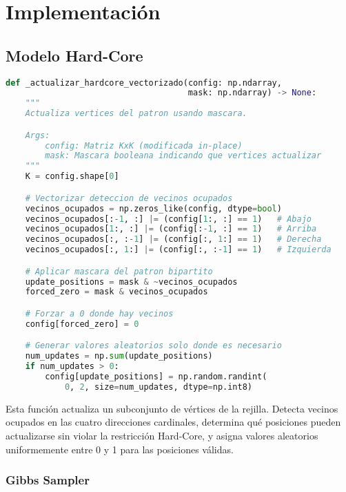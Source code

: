 \section{Implementación}

\subsection{Modelo Hard-Core}

\begin{lstlisting}[language=Python]
def _actualizar_hardcore_vectorizado(config: np.ndarray,
                                     mask: np.ndarray) -> None:
    """
    Actualiza vertices del patron usando mascara.

    Args:
        config: Matriz KxK (modificada in-place)
        mask: Mascara booleana indicando que vertices actualizar
    """
    K = config.shape[0]

    # Vectorizar deteccion de vecinos ocupados
    vecinos_ocupados = np.zeros_like(config, dtype=bool)
    vecinos_ocupados[:-1, :] |= (config[1:, :] == 1)   # Abajo
    vecinos_ocupados[1:, :] |= (config[:-1, :] == 1)   # Arriba
    vecinos_ocupados[:, :-1] |= (config[:, 1:] == 1)   # Derecha
    vecinos_ocupados[:, 1:] |= (config[:, :-1] == 1)   # Izquierda

    # Aplicar mascara del patron bipartito
    update_positions = mask & ~vecinos_ocupados
    forced_zero = mask & vecinos_ocupados

    # Forzar a 0 donde hay vecinos
    config[forced_zero] = 0

    # Generar valores aleatorios solo donde es necesario
    num_updates = np.sum(update_positions)
    if num_updates > 0:
        config[update_positions] = np.random.randint(
            0, 2, size=num_updates, dtype=np.int8)
\end{lstlisting}

Esta función actualiza un subconjunto de vértices de la rejilla. Detecta vecinos ocupados en las cuatro direcciones cardinales, determina qué posiciones pueden actualizarse sin violar la restricción Hard-Core, y asigna valores aleatorios uniformemente entre 0 y 1 para las posiciones válidas.

\subsubsection{Gibbs Sampler}

